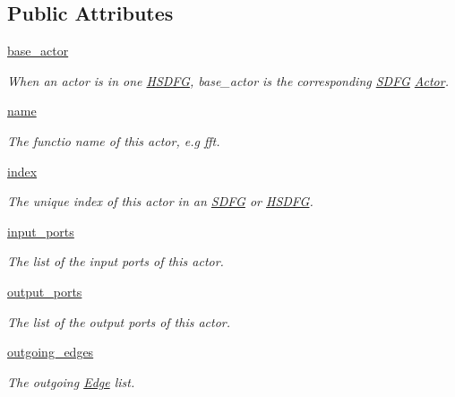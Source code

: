 \subsection*{Public Attributes}
\begin{DoxyCompactItemize}
\item 
\hyperlink{classsylva_1_1base_1_1sdf_1_1_actor_ac5ef898588204ab1eb4a8ac68fa5fd71}{base\+\_\+actor}
\begin{DoxyCompactList}\small\item\em When an actor is in one \hyperlink{classsylva_1_1base_1_1sdf_1_1_h_s_d_f_g}{H\+S\+D\+FG}, {\ttfamily base\+\_\+actor} is the corresponding \hyperlink{classsylva_1_1base_1_1sdf_1_1_s_d_f_g}{S\+D\+FG} \hyperlink{classsylva_1_1base_1_1sdf_1_1_actor}{Actor}. \end{DoxyCompactList}\item 
\hyperlink{classsylva_1_1base_1_1sdf_1_1_actor_a76ca02f41b3d1fae9d3df33f94f2fcdf}{name}
\begin{DoxyCompactList}\small\item\em The functio name of this actor, e.\+g fft. \end{DoxyCompactList}\item 
\hyperlink{classsylva_1_1base_1_1sdf_1_1_actor_adb41a566fbf747a585a1c961a011a1cf}{index}
\begin{DoxyCompactList}\small\item\em The unique index of this actor in an \hyperlink{classsylva_1_1base_1_1sdf_1_1_s_d_f_g}{S\+D\+FG} or \hyperlink{classsylva_1_1base_1_1sdf_1_1_h_s_d_f_g}{H\+S\+D\+FG}. \end{DoxyCompactList}\item 
\hyperlink{classsylva_1_1base_1_1sdf_1_1_actor_a00ccb05f3effbe2ec4bef76dd04f387d}{input\+\_\+ports}
\begin{DoxyCompactList}\small\item\em The list of the input ports of this actor. \end{DoxyCompactList}\item 
\hyperlink{classsylva_1_1base_1_1sdf_1_1_actor_ac7e5ac2deece32b06b58a499a5dd0fee}{output\+\_\+ports}
\begin{DoxyCompactList}\small\item\em The list of the output ports of this actor. \end{DoxyCompactList}\item 
\hyperlink{classsylva_1_1base_1_1sdf_1_1_actor_a11fdbcea1b73039bad4996f5380277d8}{outgoing\+\_\+edges}
\begin{DoxyCompactList}\small\item\em The outgoing \hyperlink{classsylva_1_1base_1_1sdf_1_1_edge}{Edge} list. \end{DoxyCompactList}\item 

\end{DoxyCompactItemize}
